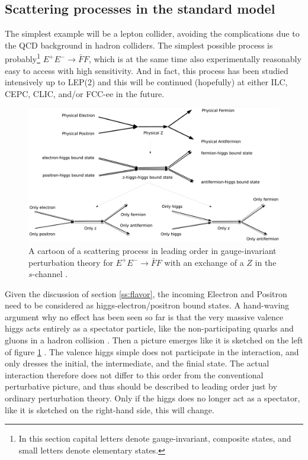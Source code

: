 \documentclass[final,twoside,12pt]{article}
\newcommand*{\1}{1\!\!\!\bot}
\begin{document}
\subsection{Scattering processes in the standard model}\label{ss:gscattering}

The simplest example will be a lepton collider, avoiding the complications due to the QCD background in hadron colliders. The simplest possible process is probably\footnote{In this section capital letters denote gauge-invariant, composite states, and small letters denote elementary states.} $E^+E^-\to{\bar F}F$, which is at the same time also experimentally reasonably easy to access with high sensitivity. And in fact, this process has been studied intensively up to LEP(2) \cite{pdg} and this will be continued (hopefully) at either ILC, CEPC, CLIC, and/or FCC-ee in the future.

\begin{figure}[!htbp]
\begin{center}
\includegraphics[width=0.8\linewidth]{scattering}
\end{center}
\caption{\label{fig:scattering}A cartoon of a scattering process in leading order in gauge-invariant perturbation theory for $E^+E^-\to{\bar F}F$ with an exchange of a $Z$ in the $s$-channel \cite{Maas:2017swq}.}
\end{figure}

Given the discussion of section \ref{ss:flavor}, the incoming Electron and Positron need to be considered as higgs-electron/positron bound states. A hand-waving argument why no effect has been seen so far is that the very massive valence higgs acts entirely as a spectator particle, like the non-participating quarks and gluons in a hadron collision \cite{BeiglboCk:2006lfa}. Then a picture emerges like it is sketched on the left of  figure \ref{fig:scattering} \cite{Maas:2012tj,Egger:2017tkd}. The valence higgs simple does not participate in the interaction, and only dresses the initial, the intermediate, and the finial state. The actual interaction therefore does not differ to this order from the conventional perturbative picture, and thus should be described to leading order just by ordinary perturbation theory. Only if the higgs does no longer act as a spectator, like it is sketched on the right-hand side, this will change.
\end{document}
